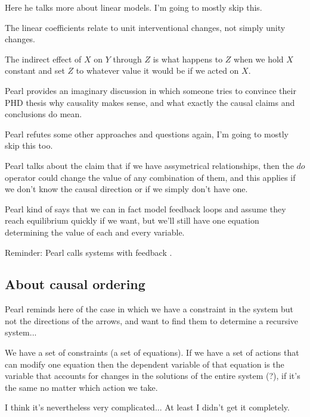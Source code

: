 Here he talks more about linear models. I'm going to mostly skip this.

The linear coefficients relate to unit interventional changes, not simply unity changes. 

The indirect effect of $X$ on $Y$ through $Z$ is what happens to $Z$ when we hold $X$ constant and set $Z$ to whatever value it would be if we acted on $X$.

Pearl provides an imaginary discussion in which someone tries to convince their PHD thesis  why causality makes sense, and what exactly the causal claims and conclusions do mean.

Pearl refutes some other approaches and questions again, I'm going to mostly skip this too.

Pearl talks about the claim that if we have assymetrical relationships, then the $do$ operator could change the value of any combination of them, and this applies if we don't know the causal direction or if we simply don't have one.

Pearl kind of says that we can in fact model feedback loops and assume they reach equilibrium quickly if we want, but we'll still have one equation determining the value of each and every variable.

Reminder: Pearl calls systems with feedback .

\subsection{About causal ordering}

Pearl reminds here of the case in which we have a constraint in the system but not the directions of the arrows, and want to find them to determine a recursive system...

We have a set of constraints (a set of equations). If we have a set of actions that can modify one equation then the dependent variable of that equation is the variable that accounts for changes in the solutions of the entire system (?), if it's the same no matter which action we take.

I think it's nevertheless very complicated... At least I didn't get it completely.
